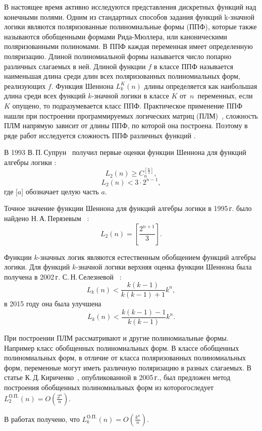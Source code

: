 \documentclass[bibliography=totoc, a4paper, 12pt]{extarticle}
\begin{document}
В настоящее время активно исследуются представления дискретных функций над
конечными полями. Одним из стандартных способов задания функций
k\nobreakdash-значной логики являются поляризованные полиномиальные формы (ППФ),
которые также называются обобщенными формами Рида-Мюллера, или каноническими
поляризованными полиномами. В ППФ каждая переменная имеет определенную
поляризацию. Длиной полиномиальной формы называется число попарно различных
слагаемых в ней. Длиной функции $f$ в классе ППФ называется наименьшая длина
среди длин всех поляризованных полиномиальных форм, реализующих $f$. Функция
Шеннона $L^K_k(n)$ длины определяется как наибольшая длина среди всех функций
$k$\nobreakdash-значной логики в классе $K$ от~$n$~переменных, если $K$ опущено,
то подразумевается класс ППФ. Практическое применение ППФ нашли при построении
программируемых логических матриц (ПЛМ)~\cite{ue04, sb90}, сложность ПЛМ
напрямую зависит от длины ППФ, по которой она построена. Поэтому в ряде работ
исследуется сложность ППФ различных функций
\cite{sv93,pn95,ss02,kk05,sd08,mn12,sm09}.

В 1993  В.\,П.\,Супрун~\cite{sv93} получил первые оценки функции Шеннона для
функций алгебры логики : $$ L_2(n) \geqslant C_n^{[\frac{n}{2}]}, $$ $$ L_2(n) <
3 \cdot 2^{n-1}, $$ где [$a$] обозначает целую часть $a$.

Точное значение функции Шеннона для функций алгебры логики в 1995\,г. было
найдено Н.\,А.\,Перязевым~\cite{pn95} :
$$
L_2(n) = \left[\frac{2^{n+1}}{3}\right].
$$

Функции $k$\nobreakdash-значных логик являются естественным обобщением функций
алгебры логики. Для функций $k$\nobreakdash-значной логики верхняя оценка
функции Шеннона была получена в 2002\,г. С.\,Н.\,Селезневой~\cite{ss02} :
$$
L_k(n) < \frac{k(k-1)}{k(k-1)+1}k^n,
$$
в 2015 году она была улучшена \cite{by15}
$$
L_k(n) < \frac{k(k-1)-1}{k(k-1)}k^n.
$$


При построении ПЛМ рассматривают и другие полиномиальные формы. Например класс
обобщенных полиномиальных форм. В классе обобщенных полиномиальных форм, в
отличие от класса поляризованных полиномиальных форм, переменные могут иметь
различную поляризацию в разных слагаемых. В статье
К.\,Д.\,Кириченко~\cite{kk05}, опубликованной в 2005\,г., был предложен метод
построения обобщенных полиномиальных форм из которогоследует
$L^{\text{О.П.}}_2(n) = O(\frac{2 ^ n}{n})$.

В работах \cite{sd08, bs14} получено, что
$L^{\text{О.П.}}_k(n) = O(\frac{k ^ n}{n})$.
\end{document}
